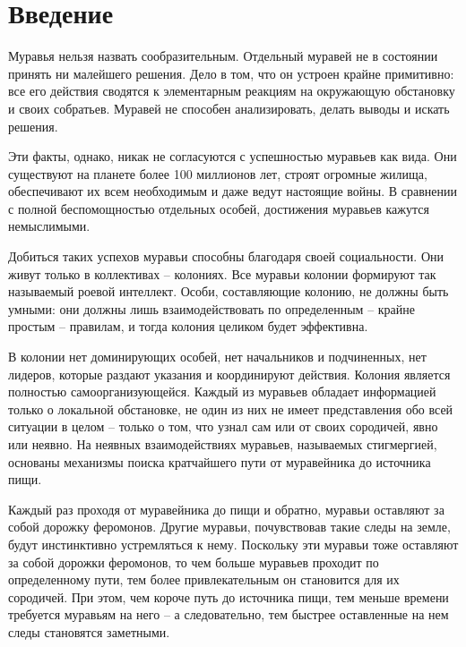 \documentclass[12pt,a4paper]{report}
\begin{document}
	
	\tableofcontents
	
\newpage
\chapter*{Введение}
	
Муравья нельзя назвать сообразительным. Отдельный муравей не в состоянии принять ни малейшего решения. Дело в том, что он устроен крайне примитивно: все его действия сводятся к элементарным реакциям на окружающую обстановку и своих собратьев. Муравей не способен анализировать, делать выводы и искать решения.

Эти факты, однако, никак не согласуются с успешностью муравьев как вида. Они существуют на планете более 100 миллионов лет, строят огромные жилища, обеспечивают их всем необходимым и даже ведут настоящие войны. В сравнении с полной беспомощностью отдельных особей, достижения муравьев кажутся немыслимыми.

Добиться таких успехов муравьи способны благодаря своей социальности. Они живут только в коллективах – колониях. Все муравьи колонии формируют так называемый роевой интеллект. Особи, составляющие колонию, не должны быть умными: они должны лишь взаимодействовать по определенным – крайне простым – правилам, и тогда колония целиком будет эффективна.

В колонии нет доминирующих особей, нет начальников и подчиненных, нет лидеров, которые раздают указания и координируют действия. Колония является полностью самоорганизующейся. Каждый из муравьев обладает информацией только о локальной обстановке, не один из них не имеет представления обо всей ситуации в целом – только о том, что узнал сам или от своих сородичей, явно или неявно. На неявных взаимодействиях муравьев, называемых стигмергией, основаны механизмы поиска кратчайшего пути от муравейника до источника пищи.

Каждый раз проходя от муравейника до пищи и обратно, муравьи оставляют за собой дорожку феромонов. Другие муравьи, почувствовав такие следы на земле, будут инстинктивно устремляться к нему. Поскольку эти муравьи тоже оставляют за собой дорожки феромонов, то чем больше муравьев проходит по определенному пути, тем более привлекательным он становится для их сородичей. При этом, чем короче путь до источника пищи, тем меньше времени требуется муравьям на него – а следовательно, тем быстрее оставленные на нем следы становятся заметными.
\end{document}
